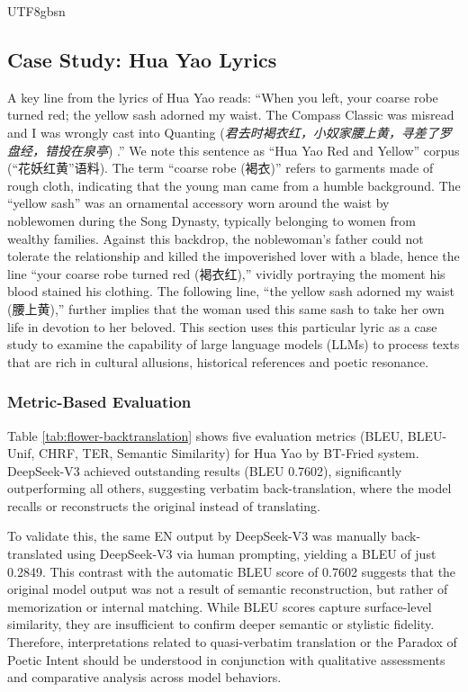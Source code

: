 \documentclass[conference]{IEEEtran}
\begin{document}
\begin{CJK}{UTF8}{gbsn}
\subsection{ Case Study: Hua Yao Lyrics}
A key line from the lyrics of Hua Yao reads: ``When you left, your coarse robe turned red; the yellow sash adorned my waist. The Compass Classic was misread and I was wrongly cast into Quanting (\textit{君去时褐衣红，小奴家腰上黄，寻差了罗盘经，错投在泉亭}) .''  We note this sentence as ``Hua Yao Red and Yellow'' corpus (``花妖红黄''语料). The term ``coarse robe (褐衣)'' refers to garments made of rough cloth, indicating that the young man came from a humble background. The ``yellow sash'' was an ornamental accessory worn around the waist by noblewomen during the Song Dynasty, typically belonging to women from wealthy families. Against this backdrop, the noblewoman’s father could not tolerate the relationship and killed the impoverished lover with a blade, hence the line ``your coarse robe turned red (褐衣红),'' vividly portraying the moment his blood stained his clothing. The following line, ``the yellow sash adorned my waist (腰上黄),'' further implies that the woman used this same sash to take her own life in devotion to her beloved. This section uses this particular lyric as a case study to examine the capability of large language models (LLMs) to process texts that are rich in cultural allusions, historical references and poetic resonance.

\subsubsection{Metric-Based Evaluation}
Table \ref{tab:flower-backtranslation} shows five evaluation metrics (BLEU, BLEU-Unif, CHRF, TER, Semantic Similarity) for Hua Yao by BT-Fried system. DeepSeek-V3 achieved outstanding results (BLEU 0.7602), significantly outperforming all others, suggesting verbatim back-translation, where the model recalls or reconstructs the original instead of translating.

To validate this, the same EN output by DeepSeek-V3 was manually back-translated using DeepSeek-V3 via human prompting, yielding a BLEU of just 0.2849. This contrast with the automatic BLEU score of 0.7602 suggests that the original model output was not a result of semantic reconstruction, but rather of memorization or internal matching. While BLEU scores capture surface-level similarity, they are insufficient to confirm deeper semantic or stylistic fidelity. Therefore, interpretations related to quasi-verbatim translation or the Paradox of Poetic Intent should be understood in conjunction with qualitative assessments and comparative analysis across model behaviors.


\end{CJK}
\end{document}
